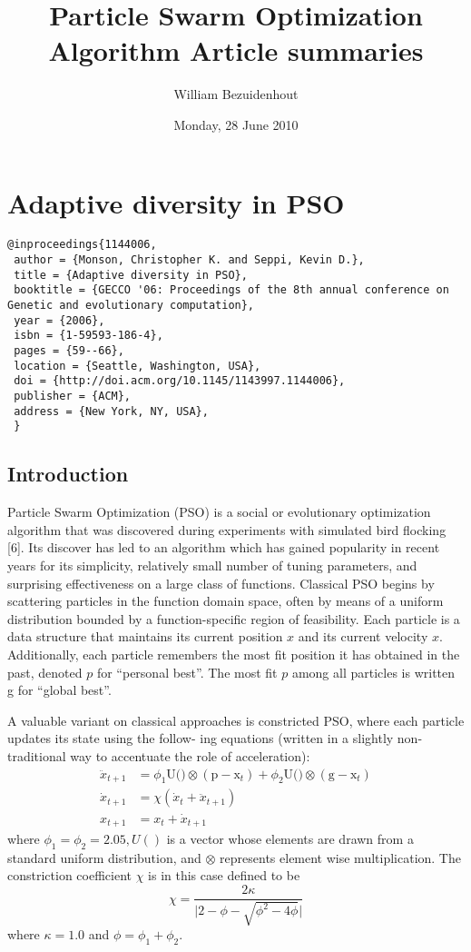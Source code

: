 \documentclass[pdftex,11pt]{article}
\title{Particle Swarm Optimization Algorithm Article summaries}
\author{William Bezuidenhout}
\date{Monday, 28 June 2010}
\begin{document}
\maketitle
\section{Adaptive diversity in PSO}
\begin{verbatim}
@inproceedings{1144006,
 author = {Monson, Christopher K. and Seppi, Kevin D.},
 title = {Adaptive diversity in PSO},
 booktitle = {GECCO '06: Proceedings of the 8th annual conference on Genetic and evolutionary computation},
 year = {2006},
 isbn = {1-59593-186-4},
 pages = {59--66},
 location = {Seattle, Washington, USA},
 doi = {http://doi.acm.org/10.1145/1143997.1144006},
 publisher = {ACM},
 address = {New York, NY, USA},
 }
\end{verbatim}
\subsection{Introduction}
Particle Swarm Optimization (PSO) is a social or evolutionary optimization algorithm that was discovered during experiments with simulated bird flocking [6]. Its discover has led to an algorithm which has gained popularity in recent years for its simplicity, relatively small number of tuning parameters, and surprising effectiveness on a large class of functions. Classical PSO begins by scattering particles in the function domain space, often by means of a uniform distribution bounded by a function-specific region of feasibility. Each particle is a data structure that maintains its current position $x$ and its current velocity $x$. Additionally, each particle remembers the most fit position it has obtained in the past, denoted $p$ for ``personal best''. The most fit $p$ among all particles is written g for ``global best''.

A valuable variant on classical approaches is constricted PSO, where each particle updates its state using the follow- ing equations (written in a slightly non-traditional way to accentuate the role of acceleration):
\begin{align}
\ddot{x}_{t+1} &= \phi_1\text{U()}\otimes (\text{p} - \text{x}_t) + \phi_2\text{U()}\otimes(\text{g} - \text{x}_t)\\
\dot{x}_{t+1} &= \chi(\dot{x}_t + \ddot{x}_{t+1}) \\
x_{t+1} &= x_t + \dot{x}_{t+1}
\end{align}
where $\phi_1 = \phi_2 = 2.05, U()$ is a vector whose elements are drawn from a standard uniform distribution, and $\otimes$ represents element wise multiplication. The constriction coefficient $\chi$ is in this case defined to be
\begin{equation}
\chi = \frac{2\kappa}{\lvert 2 - \phi - \sqrt{\phi^2 - 4\phi}\rvert}
\end{equation}
where $\kappa = 1.0$ and $\phi = \phi_1 + \phi_2$.
\end{document}
